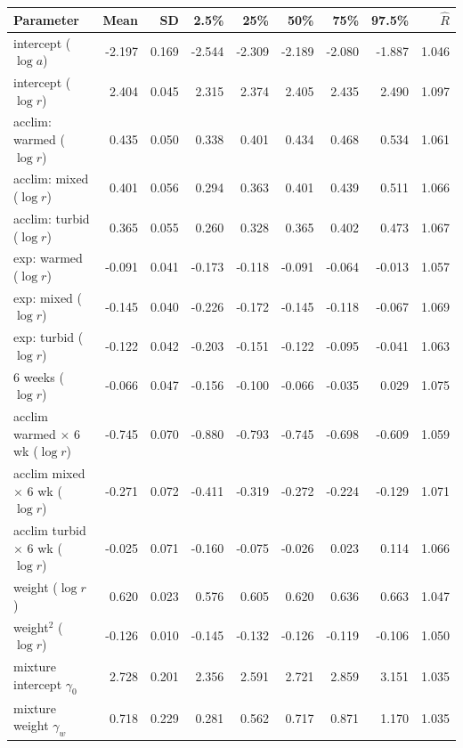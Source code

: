 \begin{tabular}{lrrrrrrrr}
\toprule
Parameter & Mean & SD & 2.5\% & 25\% & 50\% & 75\% & 97.5\% & $\hat{R}$ \\
\midrule
intercept ($\log a$) & -2.197 & 0.169 & -2.544 & -2.309 & -2.189 & -2.080 & -1.887 & 1.046 \\
intercept ($\log r$) & 2.404 & 0.045 & 2.315 & 2.374 & 2.405 & 2.435 & 2.490 & 1.097 \\
acclim: warmed ($\log r$) & 0.435 & 0.050 & 0.338 & 0.401 & 0.434 & 0.468 & 0.534 & 1.061 \\
acclim: mixed ($\log r$) & 0.401 & 0.056 & 0.294 & 0.363 & 0.401 & 0.439 & 0.511 & 1.066 \\
acclim: turbid ($\log r$) & 0.365 & 0.055 & 0.260 & 0.328 & 0.365 & 0.402 & 0.473 & 1.067 \\
exp: warmed ($\log r$) & -0.091 & 0.041 & -0.173 & -0.118 & -0.091 & -0.064 & -0.013 & 1.057 \\
exp: mixed ($\log r$) & -0.145 & 0.040 & -0.226 & -0.172 & -0.145 & -0.118 & -0.067 & 1.069 \\
exp: turbid ($\log r$) & -0.122 & 0.042 & -0.203 & -0.151 & -0.122 & -0.095 & -0.041 & 1.063 \\
6 weeks ($\log r$) & -0.066 & 0.047 & -0.156 & -0.100 & -0.066 & -0.035 & 0.029 & 1.075 \\
acclim warmed $\times$ 6 wk ($\log r$) & -0.745 & 0.070 & -0.880 & -0.793 & -0.745 & -0.698 & -0.609 & 1.059 \\
acclim mixed $\times$ 6 wk ($\log r$) & -0.271 & 0.072 & -0.411 & -0.319 & -0.272 & -0.224 & -0.129 & 1.071 \\
acclim turbid $\times$ 6 wk ($\log r$) & -0.025 & 0.071 & -0.160 & -0.075 & -0.026 & 0.023 & 0.114 & 1.066 \\
weight ($\log r$) & 0.620 & 0.023 & 0.576 & 0.605 & 0.620 & 0.636 & 0.663 & 1.047 \\
weight$^2$ ($\log r$) & -0.126 & 0.010 & -0.145 & -0.132 & -0.126 & -0.119 & -0.106 & 1.050 \\
mixture intercept $\gamma_0$ & 2.728 & 0.201 & 2.356 & 2.591 & 2.721 & 2.859 & 3.151 & 1.035 \\
mixture weight $\gamma_w$ & 0.718 & 0.229 & 0.281 & 0.562 & 0.717 & 0.871 & 1.170 & 1.035 \\
\bottomrule
\end{tabular}

